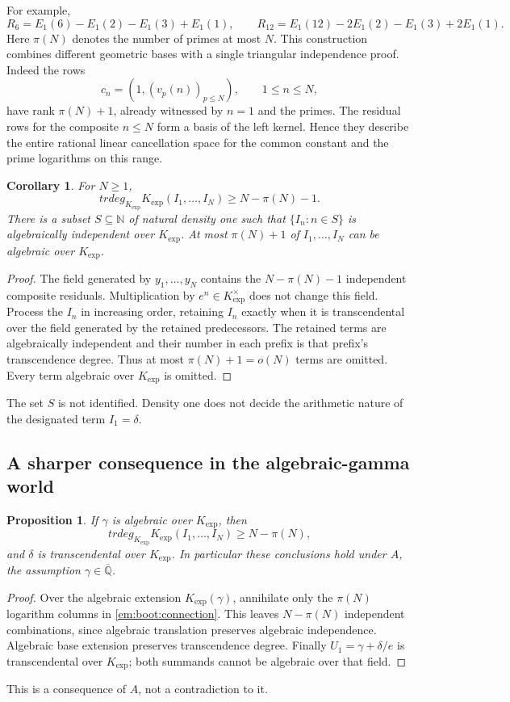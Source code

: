 \documentclass[11pt,a4paper]{article}
\newtheorem{proposition}[theorem]{Proposition}
\newtheorem{corollary}[theorem]{Corollary}
\theoremstyle{definition}
\theoremstyle{remark}
\theoremstyle{plain}
\numberwithin{equation}{section}
\def\operatorname#1{#1}\def\mathrm#1{#1}}
\begin{document}
For example,
\[
 R_6=E_1(6)-E_1(2)-E_1(3)+E_1(1),\qquad
 R_{12}=E_1(12)-2E_1(2)-E_1(3)+2E_1(1).
\]
Here $\pi(N)$ denotes the number of primes at most $N$.
This construction combines different geometric bases with a single
triangular independence proof. Indeed the rows
\[
 c_n=(1,(v_p(n))_{p\le N}),\qquad 1\le n\le N,
\]
have rank $\pi(N)+1$, already witnessed by $n=1$ and the primes.
The residual rows for the composite $n\le N$ form a basis of the left
kernel. Hence they describe the entire rational linear cancellation
space for the common constant and the prime logarithms on this range.

\begin{corollary}\label{em:boot:density}
For $N\ge1$,
\[
 \operatorname{trdeg}_{K_{\exp}}
 K_{\exp}(I_1,\ldots,I_N)\ge N-\pi(N)-1.
\]
There is a subset $S\subseteq\mathbb N$ of natural density one such that
$\{I_n:n\in S\}$ is algebraically independent over $K_{\exp}$.
At most $\pi(N)+1$ of $I_1,\ldots,I_N$ can be algebraic over
$K_{\exp}$.
\end{corollary}
\begin{proof}
The field generated by $y_1,\ldots,y_N$ contains the
$N-\pi(N)-1$ independent composite residuals. Multiplication by
$e^n\in K_{\exp}^{\times}$ does not change this field.
Process the $I_n$ in increasing order, retaining $I_n$ exactly when it
is transcendental over the field generated by the retained predecessors.
The retained terms are algebraically independent and their number in
each prefix is that prefix's transcendence degree. Thus at most
$\pi(N)+1=o(N)$ terms are omitted. Every term algebraic over
$K_{\exp}$ is omitted.
\end{proof}
The set $S$ is not identified. Density one does not decide the
arithmetic nature of the designated term $I_1=\delta$.

\subsection{A sharper consequence in the algebraic-gamma world}
\begin{proposition}\label{em:boot:A}
If $\gamma$ is algebraic over $K_{\exp}$, then
\[
 \operatorname{trdeg}_{K_{\exp}}
 K_{\exp}(I_1,\ldots,I_N)\ge N-\pi(N),
\]
and $\delta$ is transcendental over $K_{\exp}$. In particular these
conclusions hold under $\mathrm A$, the assumption
$\gamma\in\overline{\mathbb Q}$.
\end{proposition}
\begin{proof}
Over the algebraic extension $K_{\exp}(\gamma)$, annihilate only the
$\pi(N)$ logarithm columns in \eqref{em:boot:connection}. This leaves
$N-\pi(N)$ independent combinations, since algebraic translation
preserves algebraic independence. Algebraic base extension preserves
transcendence degree. Finally $U_1=\gamma+\delta/e$ is transcendental
over $K_{\exp}$; both summands cannot be algebraic over that field.
\end{proof}
This is a consequence of $\mathrm A$, not a contradiction to it.
\end{document}
